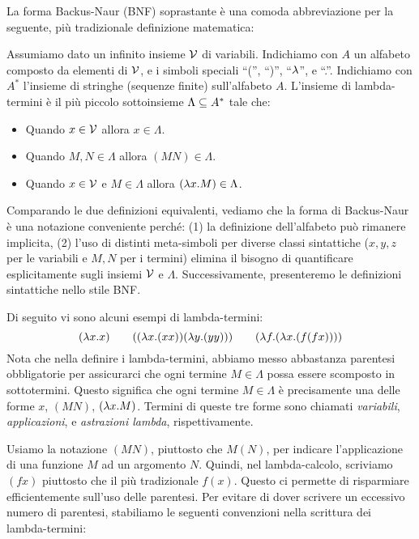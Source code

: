 \documentclass{article}
\begin{document}
La forma Backus-Naur (BNF) soprastante \`e una comoda abbreviazione per
la seguente, pi\`u tradizionale definizione matematica:

\begin{definition}
  Assumiamo dato un infinito insieme ${\cal V}$ di variabili. Indichiamo con $A$ un
  alfabeto composto da elementi di ${\cal V}$, e i simboli
  speciali ``('', ``)'', ``$\lambda$'', e ``.''. Indichiamo con $A^*$ l'insieme di
  stringhe (sequenze finite) sull'alfabeto $A$. L'insieme di
  lambda-termini \`e il pi\`u piccolo sottoinsieme $\Lambda\subseteq A^*$ tale che:
  \begin{itemize}
  \item Quando $x\in{\cal V}$ allora $x\in\Lambda$.
  \item Quando $M,N\in\Lambda$ allora $(MN)\in\Lambda$.
  \item Quando $x\in{\cal V}$ e $M\in\Lambda$ allora $(\lambda x.M)\in\Lambda$.
  \end{itemize}
\end{definition}

Comparando le due definizioni equivalenti, vediamo che la
forma di Backus-Naur \`e una notazione conveniente perché: (1) la definizione
dell'alfabeto pu\`o rimanere implicita, (2) l'uso di distinti meta-simboli
per diverse classi sintattiche ($x,y,z$ per le variabili e $M,N$ per
i termini) elimina il bisogno di quantificare esplicitamente sugli insiemi 
${\cal V}$ e $\Lambda$. Successivamente, presenteremo le 
definizioni sintattiche nello stile BNF.

Di seguito vi sono alcuni esempi di lambda-termini:
\[ (\lambda x.x) \hspace{2em} ((\lambda x.(xx))(\lambda y.(yy))) \hspace{2em} (\lambda f.(\lambda x.(f(fx))))
\]
Nota che nella definire i lambda-termini, abbiamo messo abbastanza
parentesi obbligatorie per assicurarci che ogni termine $M\in\Lambda$ possa essere
scomposto in sottotermini. Questo significa che ogni termine $M\in\Lambda$
\`e precisamente una delle forme $x$, $(MN)$, $(\lambda x.M)$. Termini di
queste tre forme sono chiamati {\em variabili}, {\em applicazioni}, e 
{\em astrazioni lambda}, rispettivamente.

Usiamo la notazione $(MN)$, piuttosto che $M(N)$, per indicare
l'applicazione di una funzione $M$ ad un argomento $N$. Quindi, nel
lambda-calcolo, scriviamo $(fx)$ piuttosto che il pi\`u tradizionale $f(x)$. Questo
ci permette di risparmiare efficientemente sull'uso delle parentesi.
Per evitare di dover scrivere un eccessivo numero di parentesi, stabiliamo
le seguenti convenzioni nella scrittura dei lambda-termini:
\end{document}
